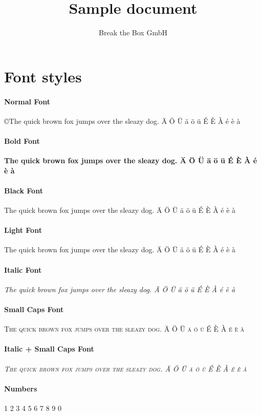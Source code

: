 \documentclass{breakthebox}
\title{Sample document}
\author{Break the Box GmbH}
\begin{document}
\maketitle
\tableofcontents
\clearpage



\section{Font styles}
\paragraph{Normal Font}
\normalfont \copyright The quick brown fox jumps over the sleazy dog. Ä Ö Ü ä ö ü É È À é è à 
\paragraph{Bold Font}
\bfseries The quick brown fox jumps over the sleazy dog.  Ä Ö Ü ä ö ü É È À é è à 
\paragraph{Black Font}
\selectfont The quick brown fox jumps over the sleazy dog.  Ä Ö Ü ä ö ü É È À é è à 
\paragraph{Light Font}
\selectfont The quick brown fox jumps over the sleazy dog.  Ä Ö Ü ä ö ü É È À é è à 
\paragraph{Italic Font}
{\itshape The quick brown fox jumps over the sleazy dog.  Ä Ö Ü ä ö ü É È À é è à }
\paragraph{Small Caps Font}
{\scshape The quick brown fox jumps over the sleazy dog.  Ä Ö Ü ä ö ü É È À é è à }
\paragraph{Italic + Small Caps Font}
{\itshape\scshape The quick brown fox jumps over the sleazy dog.  Ä Ö Ü ä ö ü É È À é è à  }
\paragraph{Numbers}
1 2 3 4 5 6 7 8 9 0
\end{document}
